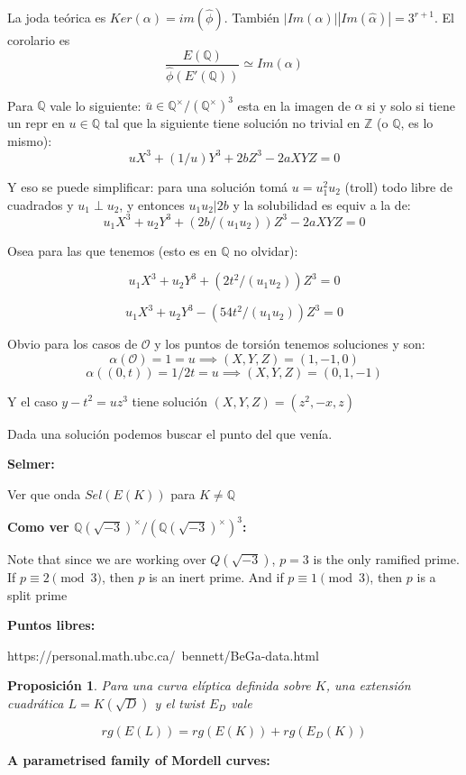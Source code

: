 \documentclass[12pt]{amsart}
\newcommand{\QQ}{\mathbb{Q}}
\newcommand{\ZZ}{\mathbb{Z}}
\newcommand{\OO}{\mathcal{O}}
\theoremstyle{plain}
\newtheorem{prop}[equation]{Proposición}
\begin{document}
La joda teórica es $Ker(\alpha) = im(\hat\phi)$. También $|Im(\alpha)||Im(\hat\alpha)| = 3^{r+1}$. El corolario es 
\[
\frac{E(\QQ)}{\hat\phi(E'(\QQ))} \simeq Im(\alpha)
\]

Para $\QQ$ vale lo siguiente: $\bar{u}\in \QQ^\times / {(\QQ^\times)}^3$ esta en la imagen de $\alpha$ si y solo si tiene un repr en $u\in \QQ$ tal que la siguiente tiene solución no trivial en $\ZZ$ (o $\QQ$, es lo mismo):
\[
uX^3 + (1/u)Y^3 + 2bZ^3 -2aXYZ= 0
\]

Y eso se puede simplificar: para una solución tomá $u=u_1^2u_2$ (troll) todo libre de cuadrados y $u_1\perp u_2$, y entonces $u_1u_2 | 2b$ y la solubilidad es equiv a la de:
\[
u_1X^3 + u_2Y^3 + (2b/(u_1u_2))Z^3 - 2aXY Z = 0 
\]

Osea para las que tenemos (esto es en $\QQ$ no olvidar):

\[
u_1X^3 + u_2Y^3 + (2t^2/(u_1u_2))Z^3 = 0
\]

\[
u_1X^3 + u_2Y^3 - (54t^2/(u_1u_2))Z^3 = 0
\]

Obvio para los casos de $\OO$ y los puntos de torsión tenemos soluciones y son:
\[
\alpha(\OO) = 1 = u \implies (X,Y,Z) = (1,-1,0)
\]
\[
\alpha((0, t)) = 1/2t = u \implies (X,Y,Z) = (0,1,-1)
\]

Y el caso $y-t^2 = uz^3$ tiene solución $(X,Y,Z) = (z^2,-x,z)$

Dada una solución podemos buscar el punto del que venía.



\textbf{Selmer:}

Ver que onda $Sel(E(K))$ para $K\neq \QQ$

\textbf{Como ver ${\QQ(\sqrt{-3})}^\times / {({\QQ(\sqrt{-3})}^\times)}^3$:}


Note that since we are working over $Q(\sqrt{-3})$, $p = 3$ is the only ramified prime. If $p \equiv 2 \pmod 3$, then $p$ is an inert prime.
And if $p \equiv 1 \pmod 3$, then $p$ is a split prime



\textbf{Puntos libres:}

https://personal.math.ubc.ca/~bennett/BeGa-data.html


\begin{prop}
Para una curva elíptica definida sobre $K$, una extensión cuadrática $L=K(\sqrt{D})$ y el twist $E_D$ vale

\[
rg(E(L)) = rg(E(K)) + rg(E_D(K))
\]
\end{prop}

\textbf{A parametrised family of Mordell curves:}
\end{document}
